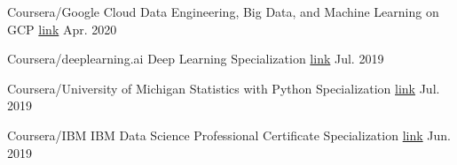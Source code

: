 


\begin{cvhonors}

  \cvhonor
    {Coursera/Google Cloud} %
    {Data Engineering, Big Data, and Machine Learning on GCP} %
    {\href{https://www.coursera.org/account/accomplishments/specialization/certificate/S6EETMYXVHTH}{link}} %
    {Apr. 2020} %

  \cvhonor
    {Coursera/deeplearning.ai} %
    {Deep Learning Specialization} %
    {\href{https://www.coursera.org/account/accomplishments/specialization/LXGTFW8N6B9W}{link}} %
    {Jul. 2019} %

  \cvhonor
    {Coursera/University of Michigan} %
    {Statistics with Python Specialization} %
    {\href{https://www.coursera.org/account/accomplishments/specialization/W952YECLMS2T}{link}} %
    {Jul. 2019} %

  \cvhonor
    {Coursera/IBM} %
    {IBM Data Science Professional Certificate Specialization} %
    {\href{https://www.coursera.org/account/accomplishments/specialization/BH2XN4WKF7ZP}{link}} %
    {Jun. 2019} %

\end{cvhonors}
